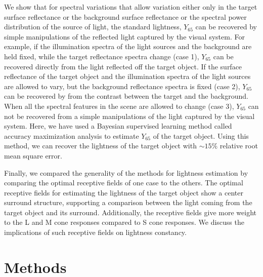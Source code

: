 \documentclass{jov}
\begin{document}
We show that for spectral variations that allow variation either only in the target surface reflectance or the background surface reflectance or the spectral power distribution of the source of light, the standard lightness, $Y_{65}$ can be recovered by simple manipulations of the reflected light captured by the visual system. For example, if the illumination spectra of the light sources and the background are held fixed, while the target reflectance spectra change (case 1), $Y_{65}$ can be recovered directly from the light reflected off the target object. If the surface reflectance of the target object and the illumination spectra of the light sources are allowed to vary, but the background reflectance spectra is fixed (case 2), $Y_{65}$ can be recovered by from the contrast between the target and the background. When all the spectral features in the scene are allowed to change (case 3), $Y_{65}$ can not be recovered from a simple manipulations of the light captured by the visual system. Here, we have used a Bayesian supervised learning method called accuracy maximization analysis to estimate $Y_{65}$ of the target object. Using this method, we can recover the lightness of the target object with $\sim 15\%$ relative root mean square error.

Finally, we compared the generality of the methods for lightness estimation by comparing the optimal receptive fields of one case to the others. The optimal receptive fields for estimating the lightness of the target object show a center surround structure, supporting a comparison between the light coming from the target object and its surround. Additionally, the receptive fields give more weight to the L and M cone responses compared to S cone responses. We discuss the implications of such receptive fields on lightness constancy. 

\section{Methods}
\end{document}
